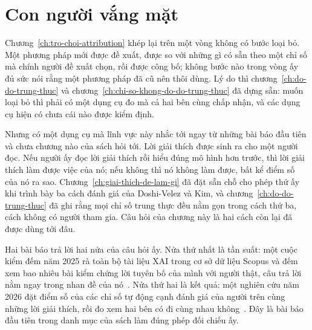 %
%
\chapter{Con người vắng mặt}
\label{ch:con-nguoi-vang-mat}

Chương~\ref{ch:tro-choi-attribution} khép lại trên một vòng không có bước loại
bỏ. Một phương pháp mới được đề xuất, được so với những gì có sẵn theo một chỉ
số mà chính người đề xuất chọn, rồi được công bố; không bước nào trong vòng ấy
đủ sức nói rằng một phương pháp đã cũ nên thôi dùng. Lý do thì
chương~\ref{ch:do-do-trung-thuc} và chương~\ref{ch:chi-so-khong-do-do-trung-thuc}
đã dựng sẵn: muốn loại bỏ thì phải có một dụng cụ đo mà cả hai bên cùng chấp
nhận, và các dụng cụ hiện có chưa cái nào được kiểm định.

Nhưng có một dụng cụ mà lĩnh vực này nhắc tới ngay từ những bài báo đầu tiên và
chưa chương nào của sách hỏi tới. Lời giải thích được sinh ra cho một người
đọc. Nếu người ấy đọc lời giải thích rồi hiểu đúng mô hình hơn trước, thì lời
giải thích làm được việc của nó; nếu không thì nó không làm được, bất kể điểm
số của nó ra sao. Chương~\ref{ch:giai-thich-de-lam-gi} đã đặt sẵn chỗ cho phép
thử ấy khi trình bày ba cách đánh giá của Doshi-Velez và Kim, và
chương~\ref{ch:do-do-trung-thuc} đã ghi rằng mọi chỉ số trung thực đều nằm gọn
trong cách thứ ba, cách không có người tham gia. Câu hỏi của chương này là hai
cách còn lại đã được dùng tới đâu.

Hai bài báo trả lời hai nửa của câu hỏi ấy. Nửa thứ nhất là tần suất: một cuộc
kiểm đếm năm 2025 rà toàn bộ tài liệu XAI trong cơ sở dữ liệu Scopus và đếm
xem bao nhiêu bài kiểm chứng lời tuyên bố của mình với người thật, câu trả lời
nằm ngay trong nhan đề của nó~\autocite{p24humangap}. Nửa thứ hai là kết quả:
một nghiên cứu năm 2026 đặt điểm số của các chỉ số tự động cạnh đánh giá của
người trên cùng những lời giải thích, rồi đo xem hai bên có đi cùng nhau
không~\autocite{p25userperception}. Đây là bài báo đầu tiên trong danh mục của
sách làm đúng phép đối chiếu ấy.

